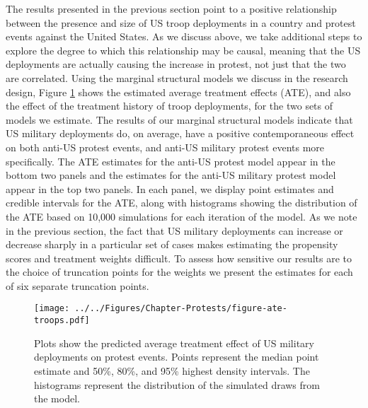The results presented in the previous section point to a positive relationship between the presence and size of US troop deployments in a country and protest events against the United States. As we discuss above, we take additional steps to explore the degree to which this relationship may be causal, meaning that the US deployments are actually causing the increase in protest, not just that the two are correlated. Using the marginal structural models we discuss in the research design, Figure \ref{fig:atetroops} shows the estimated average treatment effects (ATE), and also the effect of the treatment history of troop deployments, for the two sets of models we estimate. The results of our marginal structural models indicate that US military deployments do, on average, have a positive contemporaneous effect on both anti-US protest events, and anti-US military protest events more specifically. The ATE estimates for the anti-US protest model appear in the bottom two panels and the estimates for the anti-US military protest model appear in the top two panels. In each panel, we display point estimates and credible intervals for the ATE, along with histograms showing the distribution of the ATE based on 10,000 simulations for each iteration of the model. As we note in the previous section, the fact that US military deployments can increase or decrease sharply in a particular set of cases makes estimating the propensity scores and treatment weights difficult. To assess how sensitive our results are to the choice of truncation points for the weights we present the estimates for each of six separate truncation points. 


\begin{figure}[t]
	\centering\texttt{[image: ../../Figures/Chapter-Protests/figure-ate-troops.pdf]}
	\caption{Plots show the predicted average treatment effect of US military deployments on protest events. Points represent the median point estimate and 50\%, 80\%, and 95\% highest density intervals. The histograms represent the distribution of the simulated draws from the model.}
	\label{fig:atetroops}
\end{figure}

